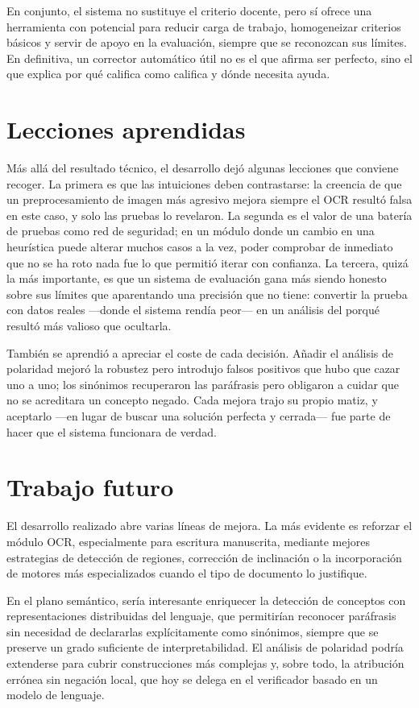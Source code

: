 En conjunto, el sistema no sustituye el criterio docente, pero sí ofrece una herramienta con potencial para reducir carga de trabajo, homogeneizar criterios básicos y servir de apoyo en la evaluación, siempre que se reconozcan sus límites. En definitiva, un corrector automático útil no es el que afirma ser perfecto, sino el que explica por qué califica como califica y dónde necesita ayuda.

\section{Lecciones aprendidas}

Más allá del resultado técnico, el desarrollo dejó algunas lecciones que conviene recoger. La primera es que las intuiciones deben contrastarse: la creencia de que un preprocesamiento de imagen más agresivo mejora siempre el OCR resultó falsa en este caso, y solo las pruebas lo revelaron. La segunda es el valor de una batería de pruebas como red de seguridad; en un módulo donde un cambio en una heurística puede alterar muchos casos a la vez, poder comprobar de inmediato que no se ha roto nada fue lo que permitió iterar con confianza. La tercera, quizá la más importante, es que un sistema de evaluación gana más siendo honesto sobre sus límites que aparentando una precisión que no tiene: convertir la prueba con datos reales —donde el sistema rendía peor— en un análisis del porqué resultó más valioso que ocultarla.

También se aprendió a apreciar el coste de cada decisión. Añadir el análisis de polaridad mejoró la robustez pero introdujo falsos positivos que hubo que cazar uno a uno; los sinónimos recuperaron las paráfrasis pero obligaron a cuidar que no se acreditara un concepto negado. Cada mejora trajo su propio matiz, y aceptarlo —en lugar de buscar una solución perfecta y cerrada— fue parte de hacer que el sistema funcionara de verdad.

\section{Trabajo futuro}

El desarrollo realizado abre varias líneas de mejora. La más evidente es reforzar el módulo OCR, especialmente para escritura manuscrita, mediante mejores estrategias de detección de regiones, corrección de inclinación o la incorporación de motores más especializados cuando el tipo de documento lo justifique.

En el plano semántico, sería interesante enriquecer la detección de conceptos con representaciones distribuidas del lenguaje, que permitirían reconocer paráfrasis sin necesidad de declararlas explícitamente como sinónimos, siempre que se preserve un grado suficiente de interpretabilidad. El análisis de polaridad podría extenderse para cubrir construcciones más complejas y, sobre todo, la atribución errónea sin negación local, que hoy se delega en el verificador basado en un modelo de lenguaje.


